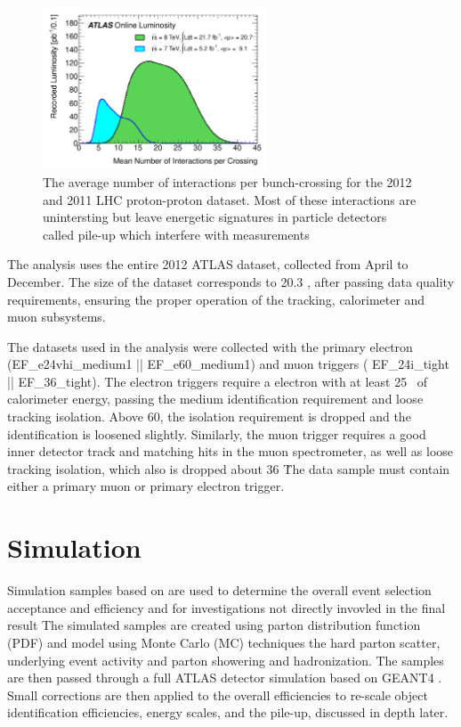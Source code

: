 \begin{figure}[!t]
\centering 
\includegraphics[width=0.60\textwidth]{figs/mu_2011_2012-dec.pdf}
\caption{ The average number of interactions per bunch-crossing for the 2012 and 2011 LHC proton-proton dataset. Most of these interactions are unintersting but leave energetic signatures in particle detectors called pile-up which interfere with measurements}\label{figure:lhc_pileup}
\end{figure} 

The \ttH analysis uses the entire 2012 ATLAS dataset, collected
from April to December. The size of the dataset corresponds to 20.3 \ifb, after passing data quality
requirements, ensuring the proper operation of the tracking, calorimeter and muon subsystems. \cite{} 

The datasets used in the analysis were collected with the primary electron
({\sc EF\_e24vhi\_medium1 || EF\_e60\_medium1}) and muon triggers ({\sc
    EF\_24i\_tight || EF\_36\_tight}). The electron triggers require a electron
with at least 25 \gev\ of calorimeter energy, passing the medium identification
requirement and loose tracking isolation.  Above 60\gev, the isolation
requirement is dropped and the identification is loosened slightly. Similarly,
            the muon trigger requires a good inner detector track and matching
            hits in the muon spectrometer, as well as loose tracking isolation,
            which also is dropped about 36 \gev\.  The data sample must contain
            either a primary muon or primary electron trigger. 

\section{Simulation}

Simulation samples based on are used to determine the 
overall event selection acceptance and efficiency and for investigations not directly invovled
in the final result The simulated samples are created using parton distribution function (PDF) and
model using Monte Carlo (MC) techniques the hard parton scatter, underlying event activity and parton showering and hadronization. 
The samples are then passed through a full ATLAS detector simulation\cite{Aad:2010ah} based on  GEANT4 \cite{Agostinelli:2002hh}.
Small corrections are then applied to the overall efficiencies to re-scale object identification efficiencies,
      energy scales, and the pile-up, discussed in depth later.  


